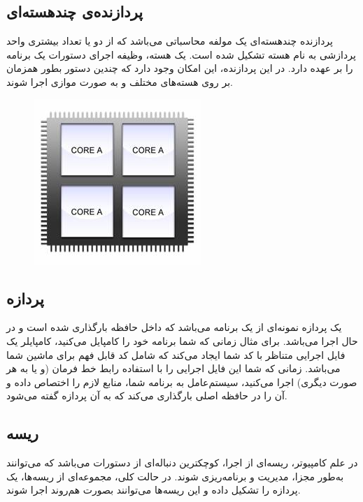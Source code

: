 \documentclass{utap}
\begin{document}
		\subsection{پردازنده‌ی چندهسته‌ای\protect{}} %
		\hspace{5mm}
پردازنده چند‌هسته‌ای یک مولفه محاسباتی  می‌باشد که از دو یا تعداد بیشتری واحد پردازشی به نام هسته تشکیل شده است. یک هسته، وظیفه اجرای دستورات یک برنامه را بر عهده دارد. در این پردازنده، این امکان وجود دارد که چندین دستور بطور همزمان بر روی هسته‌های مختلف و به صورت موازی اجرا شوند.
		\begin{figure}[H]
			\centering
			\includegraphics[width=0.30 \textwidth]{MultiCore.jpg}     
		\end{figure}
	
		\subsection{پردازه\protect{}} %
		\hspace{5mm}
	یک پردازه نمونه‌ای از یک برنامه می‌باشد که داخل حافظه بارگذاری شده است و در حال اجرا می‌باشد. برای مثال زمانی که شما برنامه‌ خود را کامپایل می‌کنید، کامپایلر یک فایل اجرایی متناظر با کد شما ایجاد می‌کند که شامل کد قابل فهم برای ماشین شما می‌باشد. زمانی که شما این فایل اجرایی را با استفاده رابط خط فرمان (و یا به هر صورت دیگری) اجرا می‌کنید،‌ سیستم‌عامل به برنامه شما، منابع لازم را اختصاص داده و آن را در حافظه اصلی بارگذاری می‌کند که به آن پردازه گفته می‌شود.

		\subsection{ریسه\protect{}} %
		\hspace{5mm}
	در علم کامپیوتر، ریسه‌ای از اجرا، کوچکترین دنباله‌ای از دستورات می‌باشد که می‌توانند به‌طور مجزا، مدیریت و برنامه‌ریزی شوند. در حالت کلی، مجموعه‌ای از ریسه‌ها، یک پردازه را تشکیل داده و این ریسه‌‌ها می‌توانند بصورت هم‌روند اجرا شوند.
	
\end{document}
